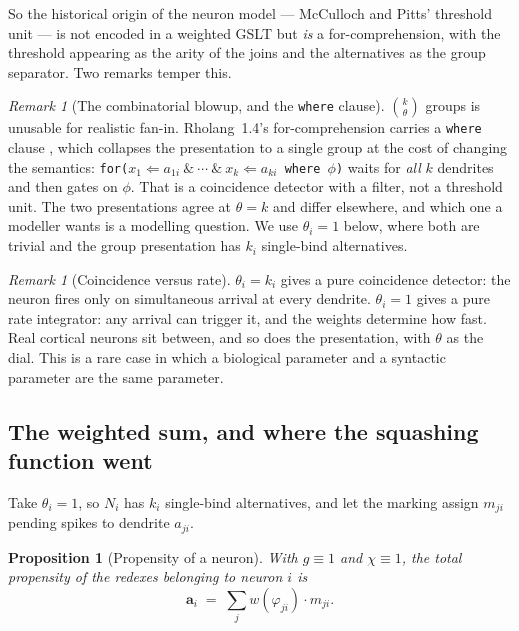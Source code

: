 \documentclass[11pt,a4paper]{article}
\theoremstyle{plain}
\newtheorem{proposition}[theorem]{Proposition}
\theoremstyle{definition}
\theoremstyle{remark}
\newtheorem{remark}[theorem]{Remark}
\newcommand{\prop}{\mathbf{a}}
\newcommand{\wmap}{w}
\newcommand{\gfac}{g}
\begin{document}
So the historical origin of the neuron model --- McCulloch and Pitts' threshold unit \cite{mcp} ---
is not encoded in a weighted GSLT but \emph{is} a for-comprehension, with the threshold appearing as
the arity of the joins and the alternatives as the group separator. Two remarks temper this.

\begin{remark}[The combinatorial blowup, and the \texttt{where} clause]
$\binom{k}{\theta}$ groups is unusable for realistic fan-in. Rholang~1.4's for-comprehension carries
a \texttt{where} clause \cite{omnibus}, which collapses the presentation to a single group at the
cost of changing the semantics: \texttt{for($x_1 \Leftarrow a_{1i}\ \&\ \cdots\ \&\ x_k \Leftarrow
a_{ki}$ where $\phi$)} waits for \emph{all} $k$ dendrites and then gates on $\phi$. That is a
coincidence detector with a filter, not a threshold unit. The two presentations agree at
$\theta = k$ and differ elsewhere, and which one a modeller wants is a modelling question. We use
$\theta_i = 1$ below, where both are trivial and the group presentation has $k_i$ single-bind
alternatives.
\end{remark}

\begin{remark}[Coincidence versus rate]
$\theta_i = k_i$ gives a pure coincidence detector: the neuron fires only on simultaneous arrival at
every dendrite. $\theta_i = 1$ gives a pure rate integrator: any arrival can trigger it, and the
weights determine how fast. Real cortical neurons sit between, and so does the presentation, with
$\theta$ as the dial. This is a rare case in which a biological parameter and a syntactic parameter
are the same parameter.
\end{remark}

\subsection{The weighted sum, and where the squashing function went}
\label{sec:squash}

Take $\theta_i = 1$, so $N_i$ has $k_i$ single-bind alternatives, and let the marking assign $m_{ji}$
pending spikes to dendrite $a_{ji}$.

\begin{proposition}[Propensity of a neuron]
\label{prop:neuron-prop}
With $\gfac \equiv 1$ and $\chi \equiv 1$, the total propensity of the redexes belonging to neuron
$i$ is
\[
\prop_i \;=\; \sum_{j} \wmap(\varphi_{ji}) \cdot m_{ji} .
\]
\end{proposition}
\end{document}
